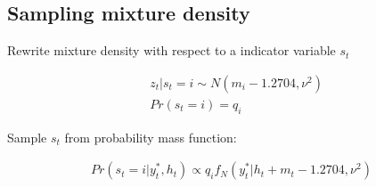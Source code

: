 \documentclass[12pt, a4paper]{article}
\begin{document}
\subsection*{Sampling mixture density}

Rewrite mixture density with respect to a indicator variable $s_t$

$$
\begin{aligned}
&z_t | s_t = i \sim N(m_i - 1.2704, \nu^2) \\
&Pr(s_t = i) = q_i
\end{aligned}
$$

Sample $s_t$ from probability mass function: 

$$
\begin{aligned}
Pr(s_t = i | y_t^{\ast}, h_t) \propto q_i f_N(y_t^{\ast} | h_t + m_t - 1.2704, \nu^2)
\end{aligned}
$$
\end{document}

